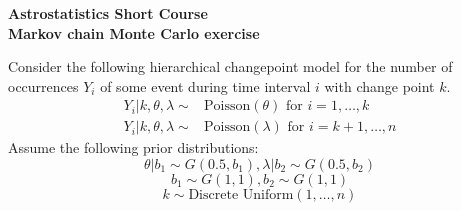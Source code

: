 \documentclass[11pt]{article}
\begin{document}
\pagestyle{empty}
\begin{center}
\Large
{\bf  Astrostatistics Short Course\\ Markov chain Monte Carlo exercise}\\
\end{center}
\normalsize
Consider the following hierarchical changepoint model for the number
of occurrences $Y_i$ of some event during time interval $i$ with change point $k$.
\begin{equation*}
\begin{split}
Y_i |k,\theta,\lambda \sim & \mbox{Poisson}(\theta) \mbox{ for } i=1,\dots,k\\
Y_i |k,\theta,\lambda \sim & \mbox{Poisson}(\lambda) \mbox{ for } i=k+1,\dots,n
\end{split}
\end{equation*}
Assume the following prior distributions:
$$\theta|b_1 \sim  G(0.5,b_1), \lambda|b_2 \sim  G(0.5,b_2)$$
$$b_1 \sim  G(1,1), b_2 \sim  G(1,1)$$
$$ k \sim \mbox{Discrete Uniform}(1,\dots,n)$$
\end{document}
